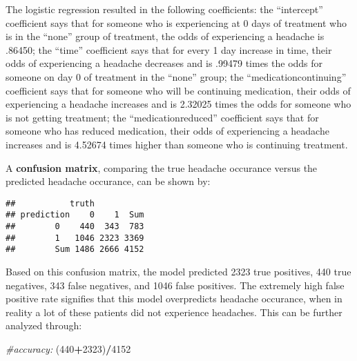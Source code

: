 \documentclass[]{article}
\newenvironment{Shaded}{\begin{snugshade}}{\end{snugshade}}
\newcommand{\CommentTok}[1]{\textcolor[rgb]{0.56,0.35,0.01}{\textit{#1}}}
\newcommand{\DataTypeTok}[1]{\textcolor[rgb]{0.13,0.29,0.53}{#1}}
\newcommand{\DecValTok}[1]{\textcolor[rgb]{0.00,0.00,0.81}{#1}}
\newcommand{\FloatTok}[1]{\textcolor[rgb]{0.00,0.00,0.81}{#1}}
\newcommand{\KeywordTok}[1]{\textcolor[rgb]{0.13,0.29,0.53}{\textbf{#1}}}
\newcommand{\NormalTok}[1]{#1}
\newcommand{\OperatorTok}[1]{\textcolor[rgb]{0.81,0.36,0.00}{\textbf{#1}}}
\newcommand{\StringTok}[1]{\textcolor[rgb]{0.31,0.60,0.02}{#1}}
\begin{document}
The logistic regression resulted in the following coefficients: the
``intercept'' coefficient says that for someone who is experiencing at 0
days of treatment who is in the ``none'' group of treatment, the odds of
experiencing a headache is .86450; the ``time'' coefficient says that
for every 1 day increase in time, their odds of experiencing a headache
decreases and is .99479 times the odds for someone on day 0 of treatment
in the ``none'' group; the ``medicationcontinuing'' coefficient says
that for someone who will be continuing medication, their odds of
experiencing a headache increases and is 2.32025 times the odds for
someone who is not getting treatment; the ``medicationreduced''
coefficient says that for someone who has reduced medication, their odds
of experiencing a headache increases and is 4.52674 times higher than
someone who is continuing treatment.

A \textbf{confusion matrix}, comparing the true headache occurance
versus the predicted headache occurance, can be shown by:

\begin{Shaded}
\end{Shaded}

\begin{verbatim}
##           truth
## prediction    0    1  Sum
##        0    440  343  783
##        1   1046 2323 3369
##        Sum 1486 2666 4152
\end{verbatim}

Based on this confusion matrix, the model predicted 2323 true positives,
440 true negatives, 343 false negatives, and 1046 false positives. The
extremely high false positive rate signifies that this model
overpredicts headache occurance, when in reality a lot of these patients
did not experience headaches. This can be further analyzed through:

\begin{Shaded}
\begin{Highlighting}[]
\CommentTok{#accuracy:}
\NormalTok{(}\DecValTok{440}\OperatorTok{+}\DecValTok{2323}\NormalTok{)}\OperatorTok{/}\DecValTok{4152}
\end{Highlighting}
\end{Shaded}
\end{document}
